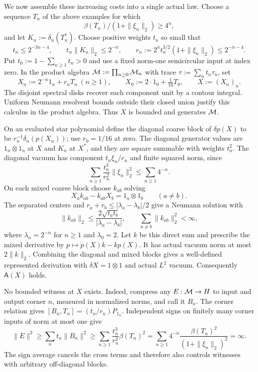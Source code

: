 We now assemble these increasing costs into a single actual law.
Choose a sequence $T_n$ of the above examples for which
\[
 \beta(T_n)/(1+\|\xi_n\|_2)\ge4^n,
\]
and let $K_n:=\delta_n(T_n^*)$.
Choose positive weights $t_n$ so small that
\[
 t_n\le2^{-3n-4},\qquad t_n\|K_n\|_2\le2^{-n},\qquad
 r_n:=2^nt_n^{3/2}(1+\|\xi_n\|_2)\le2^{-n-4}.
\]
Put $t_0:=1-\sum_{n\ge1}t_n>0$ and use a fixed norm-one semicircular input at index zero.
In the product algebra $\mathcal M:=\prod_{n\ge0}\mathcal M_n$ with trace $\tau:=\sum_nt_n\tau_n$, set
\[
 X_n:=2^{-n}1_n+r_nT_n\ (n\ge1),\qquad
 X_0:=2\cdot1_0+\tfrac1{16}T_0,\qquad X:=(X_n)_n.
\]
The disjoint spectral disks recover each component unit by a contour integral.
Uniform Neumann resolvent bounds outside their closed union justify this calculus in the product algebra.
Thus $X$ is bounded and generates $\mathcal M$.

On an evaluated star polynomial define the diagonal coarse block of $\delta p(X)$ to be $r_n^{-1}\delta_n(p(X_n))$; use $r_0=1/16$ at zero.
The diagonal generator values are $1_n\otimes1_n$ at $X$ and $K_n$ at $X^*$, and they are square summable with weights $t_n^2$.
The diagonal vacuum has component $t_n\xi_n/r_n$ and finite squared norm, since
\[
 \sum_{n\ge1}\frac{t_n^3}{r_n^2}\|\xi_n\|_2^2\le\sum_{n\ge1}4^{-n}.
\]
On each mixed coarse block choose $k_{ab}$ solving
\[
 X_ak_{ab}-k_{ab}X_b=1_a\otimes1_b\qquad(a\ne b).
\]
The separated centers and $r_a+r_b\le|\lambda_a-\lambda_b|/2$ give a Neumann solution with
\[
 \|k_{ab}\|_2\le\frac{2\sqrt{t_at_b}}{|\lambda_a-\lambda_b|},
 \qquad \sum_{a\ne b}\|k_{ab}\|_2^2<\infty,
\]
where $\lambda_n=2^{-n}$ for $n\ge1$ and $\lambda_0=2$.
Let $k$ be this direct sum and prescribe the mixed derivative by $p\mapsto p(X)k-kp(X)$.
It has actual vacuum norm at most $2\|k\|_2$.
Combining the diagonal and mixed blocks gives a well-defined represented derivation with $\delta X=1\otimes1$ and actual $L^2$ vacuum.
Consequently $\mathsf A(X)$ holds.

No bounded witness at $X$ exists.
Indeed, compress any $E:\mathcal M\to H$ to input and output corner $n$, measured in normalized norms, and call it $B_n$.
The corner relation gives $[B_n,T_n]=(t_n/r_n)P_{1_n}$.
Independent signs on finitely many corner inputs of norm at most one give
\[
 \|E\|^2\ge\sum_nt_n\|B_n\|^2
 \ge\sum_{n\ge1}\frac{t_n^3}{r_n^2}\beta(T_n)^2
 =\sum_{n\ge1}4^{-n}\frac{\beta(T_n)^2}{(1+\|\xi_n\|_2)^2}=\infty.
\]
The sign average cancels the cross terms and therefore also controls witnesses with arbitrary off-diagonal blocks.


